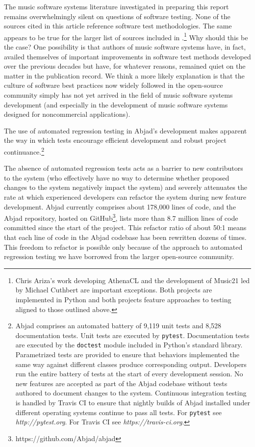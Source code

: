 \documentclass{article}
\begin{document}
The music software systems literature investigated in preparing this report
remains overwhelmingly silent on questions of software testing. None of the
sources cited in this article reference software test methodologies. The same
appears to be true for the larger list of sources included in
\cite{trevino2013compositional}.\footnote{Chris Ariza's work developing
AthenaCL \cite{Ariza2005} and the development of Music21 \cite{Ariza2010} led
by Michael Cuthbert are important exceptions. Both projects are implemented in
Python and both projects feature approaches to testing aligned to those
outlined above.} Why should this be the case? One possibility is that authors
of music software systems have, in fact, availed themselves of important
improvements in software test methods developed over the previous decades but
have, for whatever reasons, remained quiet on the matter in the publication
record. We think a more likely explanation is that the culture of software best
practices now widely followed in the open-source community simply has not yet
arrived in the field of music software systems development (and especially in
the development of music software systems designed for noncommercial
applications).

The use of automated regression testing in Abjad's development makes apparent
the way in which tests encourage efficient development and robust project
continuance.\footnote{Abjad comprises an automated battery of 9,119 unit tests
and 8,528 documentation tests. Unit tests are executed by \texttt{pytest}.
Documentation tests are executed by the \texttt{doctest} module included in
Python's standard library. Parametrized tests are provided to ensure that
behaviors implemented the same way against different classes produce
corresponding output. Developers run the entire battery of tests at the start
of every development session. No new features are accepted as part of the Abjad
codebase without tests authored to document changes to the system. Continuous
integration testing is handled by Travis CI to ensure that nightly builds of
Abjad installed under different operating systems continue to pass all tests.
For \texttt{pytest} see \textit{http://pytest.org}. For Travis CI see
\textit{https://travis-ci.org}.}

The absence of automated regression tests acts as a barrier to new contributors
to the system (who effectively have no way to determine whether proposed
changes to the system negatively impact the system) and severely attenuates the
rate at which experienced developers can refactor the system during new feature
development. Abjad currently comprises about 178,000 lines of code, and the
Abjad repository, hosted on GitHub\footnote{https://github.com/Abjad/abjad},
lists more than 8.7 million lines of code committed since the start of the
project. This refactor ratio of about 50:1 means that each line of code in the
Abjad codebase has been rewritten dozens of times. This freedom to refactor is
possible only because of the approach to automated regression testing we have
borrowed from the larger open-source community.
\end{document}
